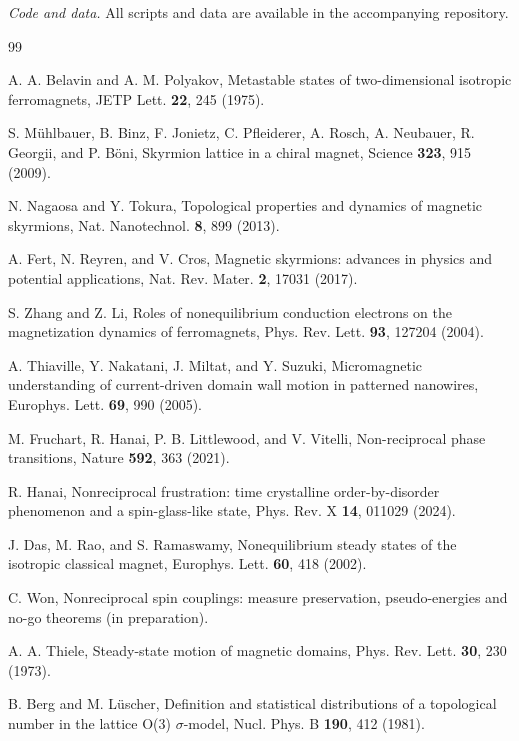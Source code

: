 \documentclass[aps,prb,twocolumn,superscriptaddress,longbibliography,floatfix]{revtex4-2}
\begin{document}
\emph{Code and data.} All scripts and data are available in the accompanying repository.

\begin{thebibliography}{99}

 A. A. Belavin and A. M. Polyakov, Metastable states of two-dimensional isotropic ferromagnets, JETP Lett. \textbf{22}, 245 (1975).

 S. M\"uhlbauer, B. Binz, F. Jonietz, C. Pfleiderer, A. Rosch, A. Neubauer, R. Georgii, and P. B\"oni, Skyrmion lattice in a chiral magnet, Science \textbf{323}, 915 (2009).

 N. Nagaosa and Y. Tokura, Topological properties and dynamics of magnetic skyrmions, Nat. Nanotechnol. \textbf{8}, 899 (2013).

 A. Fert, N. Reyren, and V. Cros, Magnetic skyrmions: advances in physics and potential applications, Nat. Rev. Mater. \textbf{2}, 17031 (2017).

 S. Zhang and Z. Li, Roles of nonequilibrium conduction electrons on the magnetization dynamics of ferromagnets, Phys. Rev. Lett. \textbf{93}, 127204 (2004).

 A. Thiaville, Y. Nakatani, J. Miltat, and Y. Suzuki, Micromagnetic understanding of current-driven domain wall motion in patterned nanowires, Europhys. Lett. \textbf{69}, 990 (2005).

 M. Fruchart, R. Hanai, P. B. Littlewood, and V. Vitelli, Non-reciprocal phase transitions, Nature \textbf{592}, 363 (2021).

 R. Hanai, Nonreciprocal frustration: time crystalline order-by-disorder phenomenon and a spin-glass-like state, Phys. Rev. X \textbf{14}, 011029 (2024).

 J. Das, M. Rao, and S. Ramaswamy, Nonequilibrium steady states of the isotropic classical magnet, Europhys. Lett. \textbf{60}, 418 (2002).

 C. Won, Nonreciprocal spin couplings: measure preservation, pseudo-energies and no-go theorems (in preparation).

 A. A. Thiele, Steady-state motion of magnetic domains, Phys. Rev. Lett. \textbf{30}, 230 (1973).

 B. Berg and M. L\"uscher, Definition and statistical distributions of a topological number in the lattice O(3) $\sigma$-model, Nucl. Phys. B \textbf{190}, 412 (1981).


\end{thebibliography}
\end{document}
